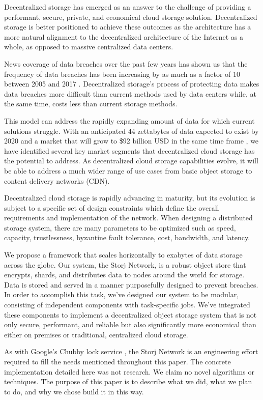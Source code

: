 \documentclass[8pt,fleqn,openany]{book}
\begin{document}
Decentralized storage has emerged as an answer to the challenge of
providing a performant, secure, private, and economical cloud storage solution.
Decentralized storage is better positioned to achieve these outcomes as the
architecture has a more natural alignment to the decentralized architecture of
the Internet as a whole, as opposed to massive centralized data centers.

News coverage of data breaches over the past few years has shown us that the
frequency of data breaches has been increasing by as much as a factor of 10
between 2005 and 2017 \cite{breaches}.
Decentralized storage's process of protecting data makes data breaches more
difficult than current methods used by data centers while, at the same time,
costs less than current storage methods.

This model can address the rapidly
expanding amount of data for which current solutions struggle.
With an anticipated 44 zettabytes of data expected to exist by 2020 and a
market that will grow to \$92 billion USD in the same time frame
\cite{storage-growth}, we have identified several key market segments that decentralized cloud storage
has the potential to address.
As decentralized cloud storage capabilities evolve, it will be able to address a much wider range of use cases from basic
object storage to content delivery networks (CDN).

Decentralized cloud storage is rapidly advancing in maturity, but its evolution
is subject to a specific set of design constraints which
define the overall requirements and implementation of
the network. When designing a distributed storage system,
there are many parameters to be optimized such as speed, capacity,
trustlessness, byzantine fault tolerance, cost, bandwidth, and latency.

We propose a framework that scales horizontally to exabytes of data storage
across the globe. Our system, the Storj Network, is a robust object store
that encrypts, shards, and distributes data to nodes around the world for
storage.
Data is stored and served in a manner purposefully designed to prevent
breaches.
In order to accomplish this task, we've designed our system to be modular,
consisting of independent components with task-specific jobs.
We've integrated these components to implement a decentralized object storage
system that is not only secure, performant, and reliable but also significantly
more economical than either on premises or traditional, centralized cloud storage.

As with Google's Chubby lock service \cite{chubby}, the Storj Network is an
engineering effort required to fill the needs mentioned throughout this paper.
The concrete implementation detailed here was not research.
We claim no novel algorithms or techniques. The purpose
of this paper is to describe what we did, what we plan to do, and why we chose build it in this way.
\end{document}
